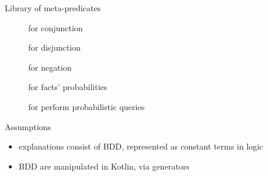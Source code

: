 \documentclass[presentation]{beamer}\mode<presentation>{\usetheme{AMSBolognaFC}}
\begin{document}
\begin{frame}[c]{Library of meta-predicates}

    \begin{description}
        \item[] for conjunction

        \vfill

        \item[] for disjunction

        \vfill

        \item[] for negation

        \vfill

        \item[] for facts' probabilities

        \vfill

        \item[] for perform probabilistic queries
    \end{description}

    \vfill

    \begin{alertblock}{Assumptions}
        \begin{itemize}
            \item explanations consist of BDD, represented as constant terms in logic
            \item BDD are manipulated in Kotlin, via \alert{generators}
        \end{itemize}
    \end{alertblock}

\end{frame}
\end{document}
